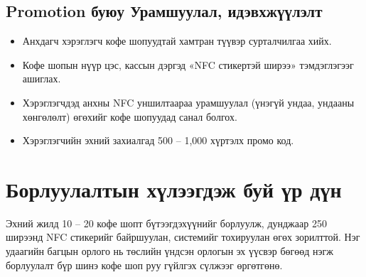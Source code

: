 \subsection{Promotion буюу Урамшуулал, идэвхжүүлэлт}

\begin{itemize}
  \item Анхдагч хэрэглэгч кофе шопуудтай хамтран түүвэр
        сурталчилгаа хийх.
  \item Кофе шопын нүүр цэс, кассын дэргэд «NFC стикертэй ширээ»
        тэмдэглэгээг ашиглах.
  \item Хэрэглэгчдэд анхны NFC уншилтаараа урамшуулал (үнэгүй
        ундаа, ундааны хөнгөлөлт) өгөхийг кофе шопуудад санал болгох.
  \item Хэрэглэгчийн эхний захиалгад 500 -- 1{,}000\textcurrency{}
        хүртэлх промо код.
\end{itemize}

\section{Борлуулалтын хүлээгдэж буй үр дүн}

Эхний жилд 10 -- 20 кофе шопт бүтээгдэхүүнийг борлуулж, дунджаар
250 ширээнд NFC стикерийг байршуулан, системийг тохируулан өгөх
зорилттой. Нэг удаагийн багцын орлого нь төслийн үндсэн орлогын
эх үүсвэр бөгөөд нэгж борлуулалт бүр шинэ кофе шоп руу гүйлгэх
сүлжээг өргөтгөнө.
